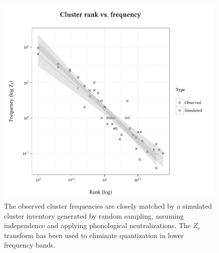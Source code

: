 \begin{figure}
\centering
\includegraphics{sim.pdf}
\caption{The observed cluster frequencies are closely matched by a simulated cluster inventory generated by random sampling, assuming independence and applying phonological neutralizations. The $Z_r$ transform \citep[][29]{Church1991} has been used to eliminate quantization in lower frequency bands.}
\label{sim}
\end{figure}

